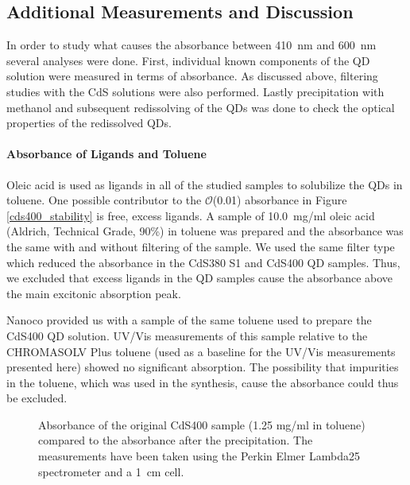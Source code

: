 \documentclass[cits]{JINST}
\begin{document}
\subsection{Additional Measurements and Discussion}
\label{discussion_sec}
In order to study what causes the absorbance between 410~nm and 600~nm several analyses were done. First, individual known components of the QD solution were measured in terms of absorbance. As discussed above, filtering studies with the CdS solutions were also performed. Lastly precipitation with methanol and subsequent redissolving of the QDs was done to check the optical properties of the redissolved QDs. 

\paragraph{Absorbance of Ligands and Toluene}
Oleic acid is used as ligands in all of the studied samples to solubilize the QDs in toluene. One possible contributor to the $\mathcal{O}$(0.01) absorbance in Figure \ref{cds400_stability} is free, excess ligands. A sample of 10.0~mg/ml oleic acid (Aldrich, Technical Grade, 90\%) in toluene was prepared and the absorbance was the same with and without filtering of the sample. We used the same filter type which reduced the absorbance in the CdS380 S1 and CdS400 QD samples. Thus, we excluded that excess ligands in the QD samples cause the absorbance above the main excitonic absorption peak. 

Nanoco provided us with a sample of the same toluene used to prepare the CdS400 QD solution. UV/Vis measurements of this sample relative to the CHROMASOLV\textsuperscript{\textregistered} Plus toluene (used as a baseline for the UV/Vis measurements presented here) showed no significant absorption. The possibility that impurities in the toluene, which was used in the synthesis, cause the absorbance could thus be excluded.  

\begin{figure}
      \begin{center}
        \caption[]{Absorbance of the original CdS400 sample (1.25 mg/ml in toluene) compared to the absorbance after the precipitation. The measurements have been taken using the Perkin Elmer Lambda25 spectrometer and a 1~cm cell. \label{cds400_precipitation}}
        \end{center}
\end{figure}
\end{document}

